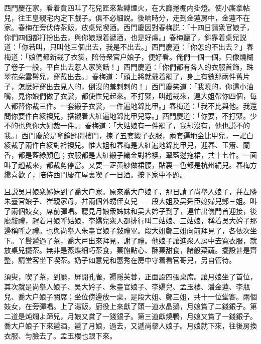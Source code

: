 西門慶在家，看着賁四叫了花兒匠來紮縛煙火，在大廳捲棚内掛燈。使小廝拿帖兒，往王皇親宅内定下戲子。俱不必細説。後响時分，走到金蓮房中，金蓮不在家。春梅在旁伏侍茶飯，放桌兒喫酒。西門慶因對春梅説：「十四日請衆官娘子，你們四個都打扮出去，與你娘跟着遞酒，也是好䖏。」春梅聽了，斜靠着桌兒説道：「你若叫，只叫他三個出去，我是不出去。」西門慶道：「你怎的不出去？」春梅道：「娘們都新裁了衣裳，陪侍衆官户娘子，便好看。俺們一個一個，只像燒糊了卷子一般，平白出去惹人家笑話！」西門慶道：「你們都有各人的衣服首飾，珠翠花朵雲髻兒，穿戴出去。」春梅道：「頭上將就戴着罷了，身上有數那兩件舊片子，怎麽好穿出去見人的，倒沒的羞剌剌的！」西門慶笑道：「我曉的，你這小油嘴，見你娘們做了衣裳，都使性兒起來。不打緊，叫趙裁來，連大姐帶你四個，每人都替你裁三件。一套緞子衣裳，一件遍地錦比甲。」春梅道：「我不比與他。我還問你要件白綾襖兒，搭襯着大紅遍地錦比甲兒穿。」西門慶道：「你要，不打緊。少不的也與你大姐裁一件。」春梅道：「大姑娘有一件罷了，我却沒有，他也説不的我。」西門慶於是拿鑰匙開樓門，揀了五套緞子衣服，兩套遍地金比甲兒，一疋白綾裁了兩件白綾對衿襖兒。惟大姐和春梅是大紅遍地錦比甲兒，迎春、玉簫、蘭香，都是藍綠顏色；衣服都是大紅緞子織金對衿襖，翠藍邊拖裙，共十七件。一面叫了趙裁來，都裁剪停當。又要一疋黄紗做裙腰，貼裏一色都是杭州絹兒。春梅方纔喜歡了，陪侍西門慶在屋裏喫了一日酒。按下家中不題。

且説吳月娘衆姊妹到了喬大户家。原來喬大户娘子，那日請了尚擧人娘子，幷左隣朱臺官娘子、崔親家母，幷兩個外甥侄女兒——段大姐及吴舜臣媳婦兒鄭三姐。叫了兩個妓女，席前彈唱。聽見月娘衆姊妹和吴大妗子到了，連忙出儀門首迎接，後廳敍禮，趕着月娘呼姑娘，李嬌兒衆人都排行叫二姑娘、三姑娘，稱着吳大妗子那邊稱呼之禮。也與尚擧人朱臺官娘子敍禮畢。段大姐鄭三姐向前拜見了，各依次坐下。丫鬟遞過了茶，喬大戸出來拜見，謝了禮。他娘子讓進衆人房中去寬衣服，就放桌兒擺茶。無非是蒸煠細巧茶食，菓餡點心、酥菓甜食，諸般菜蔬。擺設甚是齊整，請堂客坐下喫茶。奶子如意兒和惠秀在房中守着看官哥兒，另自管待。

須臾，喫了茶，到廳，屏開孔雀，褥隱芙蓉，正面設四張桌席。讓月娘坐了首位，其次就是尚擧人娘子、吴大妗子、朱臺官娘子、李嬌兒、孟玉樓、潘金蓮、李瓶兒、喬大户娘子關席；坐位傍邊放一桌，是段大姐、鄭三姐，共十一位堂客。兩個妓女，在旁彈唱。上了湯飯，廚役上來獻了頭一道水晶鵝，月娘賞了二錢銀子。第二道是炖爛よ蹄兒，月娘又賞了一錢銀子。第三道獻燒鴨，月娘又賞了一錢銀子。喬大户娘子下來遞酒，遞了月娘，過去，又遞尚擧人娘子。月娘就下來，往後房換衣服、匀臉去了。孟玉樓也跟下來。

